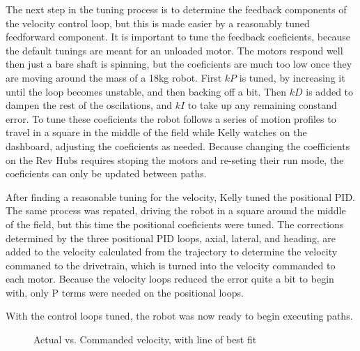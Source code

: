\documentclass{article}
\begin{document}
The next step in the tuning process is to determine the feedback components of the velocity control loop, but this is made easier by a reasonably tuned feedforward component. It is important to tune the feedback coeficients, because the default tunings are meant for an unloaded motor. The motors respond well then just a bare shaft is spinning, but the coeficients are much too low once they are moving around the mass of a 18kg robot. First $kP$ is tuned, by increasing it until the loop becomes unstable, and then backing off a bit. Then $kD$ is added to dampen the rest of the oscilations, and $kI$ to take up any remaining constand error. To tune these coeficients the robot follows a series of motion profiles to travel in a square in the middle of the field while Kelly watches on the dashboard, adjusting the coeficients as needed. Because changing the coefficients on the Rev Hubs requires stoping the motors and re-seting their run mode, the coeficients can only be updated between paths.

After finding a reasonable tuning for the velocity, Kelly tuned the positional PID. The same process was repated, driving the robot in a square around the middle of the field, but this time the positional coeficients were tuned. The corrections determined by the three positional PID loops, axial, lateral, and heading, are added to the velocity calculated from the trajectory to determine the velocity commaned to the drivetrain, which is turned into the velocity commanded to each motor. Because the velocity loops reduced the error quite a bit to begin with, only P terms were needed on the positional loops. 

With the control loops tuned, the robot was now ready to begin executing paths.

\begin {figure}
\centering
{}
\caption {Actual vs. Commanded velocity, with line of best fit}
\label {fig:graph}
\end{figure}
\end{document}
